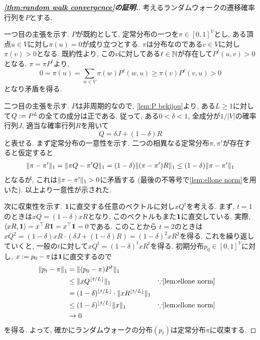 \begin{proof}[\textbf{\cref{thm:random walk convergence}の証明.}]
  考えるランダムウォークの遷移確率行列を$P$とする.

  一つ目の主張を示す.
  $P$が既約として, 定常分布の一つを$\pi \in [0,1]^V$とし,
  ある頂点$u\in V$に対し$\pi(u)=0$が成り立つとする.
  $\pi$は分布なのである$v\in V$に対し$\pi(v)>0$となる.
  既約性より, この$v$に対してある$\ell\in\mathbb{N}$が存在して$P^\ell(u,v)>0$となる.
  $\pi =\pi P^\ell$より,
  \[
    0 = \pi(u) = \sum_{w\in V}\pi(w)P^\ell(w,u) \ge \pi(v)P^\ell(v,u)>0
  \]
  となり矛盾を得る.

  二つ目の主張を示す.
  $P$は非周期的なので, \cref{lem:P bekijou}より, ある$L\ge 1$に対して$Q\mathrel{:=} P^L$の全ての成分は正である.
  従って, ある$0<\delta<1$, 全成分が$1/|V|$の確率行列$J$, 適当な確率行列$R$を用いて
  \[
    Q = \delta J + (1-\delta)R
  \]
  と表せる.
  まず定常分布の一意性を示す.
  二つの相異なる定常分布$\pi,\pi'$が存在すると仮定すると
  \begin{align*}
    \lVert\pi - \pi'\rVert_1 = \lVert\pi Q -  \pi' Q\rVert_1 = (1-\delta)\lVert(\pi - \pi')R\rVert_1 \le  (1-\delta)\lVert\pi - \pi'\rVert_1
  \end{align*}
  となるが, これは$\lVert\pi - \pi'\rVert_1>0$に矛盾する (最後の不等号で\cref{lem:ellone norm}を用いた).
  以上より一意性が示された.

  次に収束性を示す.
  $\mathbf{1}$に直交する任意のベクトルに対し$xQ^t$を考える.
  まず, $t=1$のときは$xQ = (1-\delta) xR$となり, このベクトルもまた$\mathbf{1}$に直交している.
  実際, $\langle xR,\mathbf{1}\rangle = x^\top R \mathbf{1} = x^\top \mathbf{1} = 0$である.
  このことから
  $t=2$のときは$xQ^2 = (1-\delta)xR \cdot (\delta J + (1-\delta) R) =(1-\delta)^2 xR^2$を得る.
  これを繰り返していくと, 一般の$t$に対して$xQ^t = (1-\delta)^txR^t$を得る.
  初期分布$p_0\in[0,1]^V$に対し, $x\mathrel{:=} p_0 - \pi$は$\mathbf{1}$に直交するので
  \begin{align*}
    \norm{p_t - \pi}_{1} &= \norm{(p_0-\pi)P^t}_{1} \\
    &\le \norm{xQ^{\floor{t/L}}}_{1} & & \text{$\because$\cref{lem:ellone norm}}\\
    &= (1-\delta)^{\floor{t/L}}\cdot \norm{x R^{\floor{t/L}}}_1 \\
    & \le (1-\delta)^{\floor{t/L}} \norm{x}_{1} & & \text{$\because$\cref{lem:ellone norm}} \\
    & \to 0
  \end{align*}
  を得る.
  よって, 確かにランダムウォークの分布$(p_t)$は定常分布$\pi$に収束する.
\end{proof}

